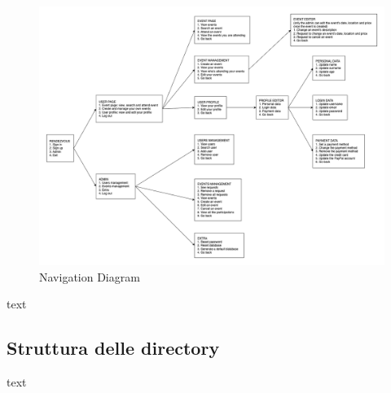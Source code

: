 \documentclass[11pt]{article}
\begin{document}
            \begin{figure}[H]
                \centering
                \includegraphics[width=\textwidth]{navigation_diagram/navigation_diagram}
                \caption{Navigation Diagram}
                \label{fig:navigation-diagram}
            \end{figure}

            text

        \subsection{Struttura delle directory} \label{subsec:struttura-delle-directory}

            text
\end{document}
